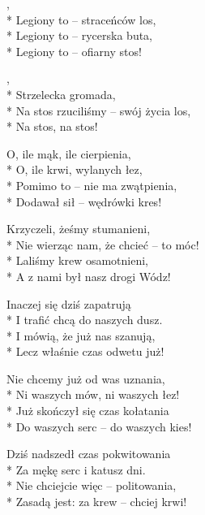 \begin{lyrics}[longestline={Na stos rzuciliśmy -- swój życia los,}]

,\\*
Legiony to -- straceńców los,\\*
Legiony to -- rycerska buta,\\*
Legiony to -- ofiarny stos!

\begin{chorus}
,\\*
Strzelecka gromada,\\*
Na stos rzuciliśmy -- swój życia los,\\*
Na stos, na stos!
\end{chorus}

O, ile mąk, ile cierpienia,\\*
O, ile krwi, wylanych łez,\\*
Pomimo to -- nie ma zwątpienia,\\*
Dodawał sił -- wędrówki kres!

\chorusref

Krzyczeli, żeśmy stumanieni,\\*
Nie wierząc nam, że chcieć -- to móc!\\*
Laliśmy krew osamotnieni,\\*
A z nami był nasz drogi Wódz!

\chorusref

Inaczej się dziś zapatrują\\*
I trafić chcą do naszych dusz.\\*
I mówią, że już nas szanują,\\*
Lecz właśnie czas odwetu już!

\chorusref

\breaklyrics

Nie chcemy już od was uznania,\\*
Ni waszych mów, ni waszych łez!\\*
Już skończył się czas kołatania\\*
Do waszych serc -- do waszych kies!

\chorusref

Dziś nadszedł czas pokwitowania\\*
Za mękę serc i katusz dni.\\*
Nie chciejcie więc -- politowania,\\*
Zasadą jest: za krew -- chciej krwi!

\chorusref


\end{lyrics}
